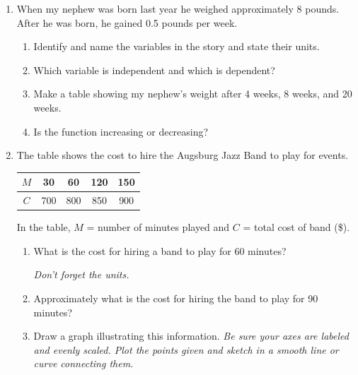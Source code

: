\documentclass[12pt]{article}
\begin{document}
\begin{enumerate}

\item When my nephew was born last year he weighed approximately 8 pounds.  After he was born, he gained 0.5 pounds per week.

\begin{enumerate}
\item Identify and name the variables in the story and state their units.
\vfill
\item Which variable is independent and which is dependent?
\vfill
\item Make a table showing my nephew's weight after 4 weeks, 8 weeks, and 20 weeks.
\vfill
\vfill
\vfill
\item Is the function increasing or decreasing?
\vfill
\end{enumerate}

\newpage


\item The table shows the cost to hire the Augsburg Jazz Band to play for events.  

\begin{center}
\begin{tabular} {|c|c|c|c|c|} \hline
$M$ & 30 & 60 & 120 & 150 \\ \hline
$C$ & 700 & 800 & 850 & 900 \\ \hline
\end{tabular}
\end{center}

In the table, $M$ = number of minutes played and $C$ = total cost of band  (\$).

\begin{enumerate}
\item What is the cost for hiring a band to play for 60 minutes?

\emph{Don't forget the units.}
\vfill
\item Approximately what is the cost for hiring the band to play for 90 minutes?
\vfill
\item Draw a graph illustrating this information.  \emph{Be sure your axes are labeled and evenly scaled.  Plot the points given and sketch in a smooth line or curve connecting them.}


\end{enumerate}
\end{enumerate}
\end{document}
